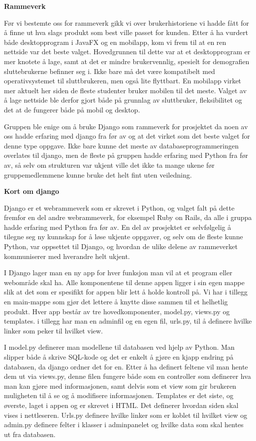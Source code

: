 \documentclass[12pt,a4paper,norsk]{article}
\begin{document}
\bigskip \noindent \textbf{Rammeverk}
\par Før vi bestemte oss for rammeverk gikk vi over brukerhistoriene vi hadde fått for å finne ut hva slags produkt som best ville passet for kunden. Etter å ha vurdert både desktopprogram i JavaFX og en mobilapp, kom vi frem til at en ren nettside var det beste valget. Hovedgrunnen til dette var at et desktopprogram er mer knotete å lage, samt at det er mindre brukervennlig, spesielt for demografien sluttebrukerne befinner seg i. Ikke bare må det være kompatibelt med operativsystemet til sluttbrukeren, men også lite flyttbart. En mobilapp virket mer aktuelt her siden de fleste studenter bruker mobilen til det meste. Valget av å lage nettside ble derfor gjort både på grunnlag av sluttbruker, fleksibilitet og det at de fungerer både på mobil og desktop.

Gruppen ble enige om å bruke Django som rammeverk for prosjektet da noen av oss hadde erfaring med django fra før av og at det virket som det beste valget for denne type oppgave. Ikke bare kunne det meste av databaseprogrammeringen overlates til django, men de fleste på gruppen hadde erfaring med Python fra før av, så selv om strukturen var ukjent ville det ikke ta mange ukene før gruppemedlemmene kunne bruke det helt fint uten veiledning.

\bigskip \noindent \textbf{Kort om django}
\par Django er et webrammeverk som er skrevet i Python, og valget falt på dette fremfor en del andre webrammeverk, for eksempel Ruby on Rails, da alle i gruppa hadde erfaring med Python fra før av. En del av prosjektet er selvfølgelig å tilegne seg ny kunnskap for å løse ukjente oppgaver, og selv om de fleste kunne Python, var oppsettet til Django, og hvordan de ulike delene av rammeverket kommuniserer med hverandre helt ukjent.

I Django lager man en ny app for hver funksjon man vil at et program eller webområde skal ha. Alle komponentene til denne appen ligger i sin egen mappe slik at det som er spesifikt for appen blir lett å holde kontroll på. Vi har i tillegg en main-mappe som gjør det lettere å knytte disse sammen til et helhetlig produkt. Hver app består av tre hovedkomponenter, model.py, views.py og templates. i tillegg har man en adminfil og en egen fil, urls.py, til å definere hvilke linker som peker til hvilket view.

I model.py definerer man modellene til databasen ved hjelp av Python. Man slipper både å skrive SQL-kode og det er enkelt å gjøre en kjapp endring på databasen, da django ordner det for en. Etter å ha definert feltene vil man hente dem ut via views.py, denne filen fungere både som en controller som definerer hva man kan gjøre med informasjonen, samt delvis som et view som gir brukeren muligheten til å se og å modifisere informasjonen. Templates er det siste, og øverste, laget i appen og er skrevet i HTML. Det definerer hvordan siden skal vises i nettleseren. Urls.py definere hvilke linker som er koblet til hvilket view og admin.py definere felter i klasser i adminpanelet og hvilke data som skal hentes ut fra databasen.
\end{document}
